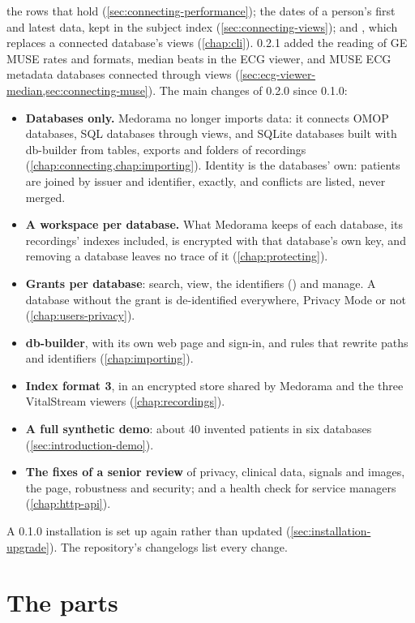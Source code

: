the rows that hold (\cref{sec:connecting-performance}); the dates of a person's first and latest
data, kept in the subject index (\cref{sec:connecting-views}); and ,
which replaces a connected database's views (\cref{chap:cli}). 0.2.1 added the reading
of GE MUSE rates and formats, median beats in the ECG viewer, and MUSE ECG metadata databases
connected through views (\cref{sec:ecg-viewer-median,sec:connecting-muse}). The main changes of
0.2.0 since 0.1.0:
\begin{itemize}
\item \textbf{Databases only.} Medorama no longer imports data: it connects OMOP databases, SQL
  databases through views, and SQLite databases built with db-builder from tables, exports and
  folders of recordings (\cref{chap:connecting,chap:importing}). Identity is the databases'
  own: patients are joined by issuer and identifier, exactly, and conflicts are listed, never
  merged.
\item \textbf{A workspace per database.} What Medorama keeps of each database, its recordings'
  indexes included, is encrypted with that database's own key, and removing a database leaves
  no trace of it (\cref{chap:protecting}).
\item \textbf{Grants per database}: search, view, the identifiers () and manage. A
  database without the  grant is de-identified everywhere, Privacy Mode or not
  (\cref{chap:users-privacy}).
\item \textbf{db-builder}, with its own web page and sign-in, and rules that rewrite paths and
  identifiers (\cref{chap:importing}).
\item \textbf{Index format 3}, in an encrypted store shared by Medorama and the three
  VitalStream viewers (\cref{chap:recordings}).
\item \textbf{A full synthetic demo}: about 40 invented patients in six databases
  (\cref{sec:introduction-demo}).
\item \textbf{The fixes of a senior review} of privacy, clinical data, signals and images, the
  page, robustness and security; and a health check for service managers
  (\cref{chap:http-api}).
\end{itemize}
A 0.1.0 installation is set up again rather than updated (\cref{sec:installation-upgrade}).
The repository's changelogs list every change.

\section{The parts}
\label{sec:introduction-parts}

